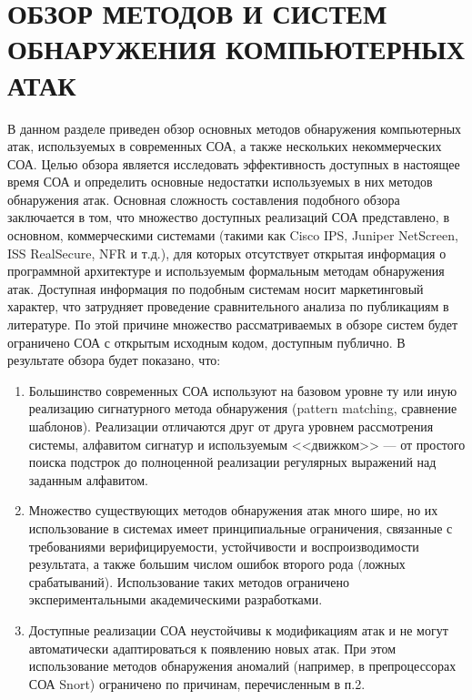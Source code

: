 \section{ОБЗОР МЕТОДОВ И СИСТЕМ \\ОБНАРУЖЕНИЯ КОМПЬЮТЕРНЫХ АТАК}

В данном разделе приведен обзор основных методов обнаружения компьютерных атак, используемых в современных СОА, а также нескольких некоммерческих СОА.
Целью обзора является исследовать эффективность доступных в настоящее время СОА и определить основные недостатки используемых в них методов обнаружения атак. Основная сложность составления подобного обзора заключается в том, что множество доступных реализаций СОА представлено, в основном, коммерческими системами (такими как Cisco IPS, Juniper NetScreen, ISS RealSecure, NFR и т.д.), для которых отсутствует открытая информация о программной архитектуре и используемым формальным методам обнаружения атак. Доступная информация по подобным системам носит маркетинговый характер, что затрудняет проведение сравнительного анализа по публикациям в литературе. По этой причине множество рассматриваемых в обзоре систем будет ограничено СОА с открытым исходным кодом, доступным публично.
В результате обзора будет показано, что:

\begin{enumerate}

\item Большинство современных СОА используют на базовом уровне ту или иную реализацию сигнатурного метода обнаружения (pattern matching, сравнение шаблонов). Реализации отличаются друг от друга уровнем рассмотрения системы, алфавитом сигнатур и используемым <<движком>> --- от простого поиска подстрок до полноценной реализации регулярных выражений над заданным алфавитом.
\item Множество существующих методов обнаружения атак много шире, но их использование в системах имеет принципиальные ограничения, связанные с требованиями верифицируемости, устойчивости и воспроизводимости результата, а также большим числом ошибок второго рода (ложных срабатываний). Использование таких методов ограничено экспериментальными академическими разработками.
\item Доступные реализации СОА неустойчивы к модификациям атак и не могут автоматически адаптироваться к появлению новых атак. При этом использование методов обнаружения аномалий (например, в препроцессорах СОА Snort) ограничено по причинам, перечисленным в п.2.

\end{enumerate}


